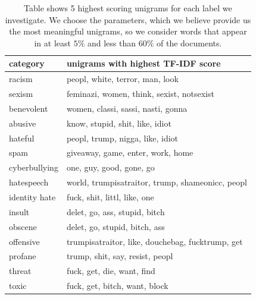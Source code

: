 \documentclass[fleqn,moreauthors,10pt]{ds_report}
\begin{document}
\begin{table}[htb]
\scriptsize
\centering
\begin{tabular}{l|l}
\toprule
\textbf{category}   & \textbf{unigrams with highest TF-IDF score} \\ \midrule
racism     & peopl, white, terror, man, look                \\ \hline
sexism     & feminazi, women, think, sexist, notsexist                \\ \hline
benevolent & women, classi, sassi, nasti, gonna            \\ \hline
abusive    & know, stupid, shit, like, idiot  \\ \hline
hateful    & peopl, trump, nigga, like, idiot    \\ \hline
spam       & giveaway, game, enter, work, home            \\ \hline
cyberbullying       & one, guy, good, gone, go             \\ \hline
hatespeech      & world, trumpisatraitor, trump, shameonicc, peopl             \\ \hline
identity hate       & fuck, shit, littl, like, one             \\ \hline
insult       & delet, go, ass, stupid, bitch        \\ \hline
obscene       & delet, go, stupid, bitch, ass             \\ \hline
offensive       & trumpisatraitor, like, douchebag, fucktrump, get            \\ \hline
profane       & trump, shit, say, resist, peopl             \\ \hline
threat       & fuck, get, die, want, find           \\ \hline
toxic       & fuck, get, bitch, want, block             \\ \bottomrule
\end{tabular}
\caption{Table shows 5 highest scoring unigrams for each label we investigate. We choose the parameters, which we believe provide us the most meaningful unigrams, so we consider words that appear in at least $5\%$ and less than $60\%$ of the documents.}
\label{tab:tf-idf}
\end{table}
\end{document}
